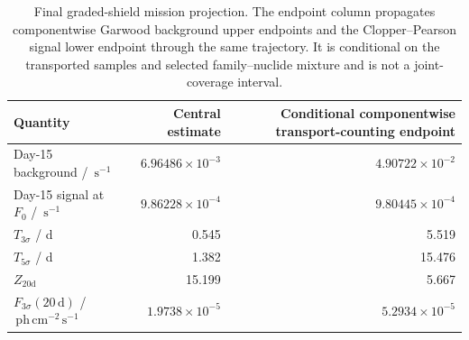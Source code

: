 \documentclass[11pt]{article}
\newcommand{\phcms}{\ensuremath{\,\mathrm{ph\,cm^{-2}\,s^{-1}}}}
\newcommand{\cps}{\ensuremath{\,\mathrm{s^{-1}}}}
\newcommand{\fzero}{F_{0}}
\newcommand{\fthree}{F_{3\sigma}}
\begin{document}
\begin{table}[!ht]
\centering
\caption{Final graded-shield mission projection. The endpoint column propagates componentwise Garwood background upper endpoints and the Clopper--Pearson signal lower endpoint through the same trajectory. It is conditional on the transported samples and selected family--nuclide mixture and is not a joint-coverage interval.}
\label{tab:primary_sensitivity}
\footnotesize
\begin{tabular}{lrr}
\toprule
Quantity & Central estimate & Conditional componentwise transport-counting endpoint \\
\midrule
Day-15 background / $\cps$ & $6.96486\times10^{-3}$ & $4.90722\times10^{-2}$ \\
Day-15 signal at $\fzero$ / $\cps$ & $9.86228\times10^{-4}$ & $9.80445\times10^{-4}$ \\
$T_{3\sigma}$ / d & 0.545 & 5.519 \\
$T_{5\sigma}$ / d & 1.382 & 15.476 \\
$Z_{20\mathrm{d}}$ & 15.199 & 5.667 \\
$\fthree(20\,\mathrm{d})$ / $\phcms$ & $1.9738\times10^{-5}$ & $5.2934\times10^{-5}$ \\
\bottomrule
\end{tabular}
\end{table}
\end{document}
